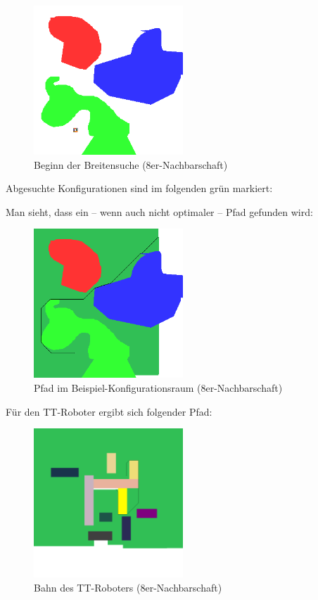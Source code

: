 \documentclass[11pt, a4paper]{article}
\begin{document}
\begin{figure}[H]
	\center
	\includegraphics[width=0.5\textwidth,frame,viewport=75 35 125 85, clip]{../Termin6/Termin6/cspace_bfs_start.png}
	\caption{Beginn der Breitensuche (8er-Nachbarschaft)}
\end{figure}

Abgesuchte Konfigurationen sind im folgenden grün markiert:

Man sieht, dass ein -- wenn auch nicht optimaler -- Pfad gefunden wird:
\begin{figure}[H]
	\center
	\includegraphics[width=0.5\textwidth,frame]{../Termin6/Termin6/cspace_bfs_8nb.png}
	\caption{Pfad im Beispiel-Konfigurationsraum (8er-Nachbarschaft)}
\end{figure}

Für den TT-Roboter ergibt sich folgender Pfad:

\begin{figure}[H]
	\center\includegraphics[width=0.5\textwidth,frame]{../Termin6/Termin6/cspace_prismatic_bfs.png}
	\caption{Bahn des TT-Roboters (8er-Nachbarschaft)}
\end{figure}
\end{document}
